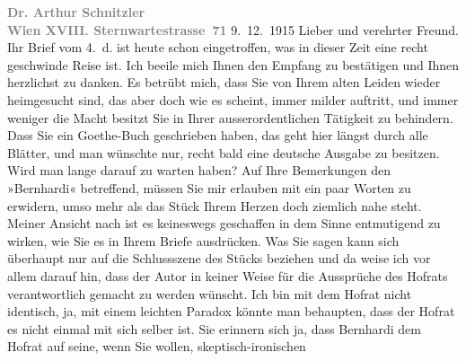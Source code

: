 \begin{ledgroupsized}[t]{13cm}
           \noindent{}{\pb}\textcolor{gray}{\textbf{Dr. Arthur Schnitzler}}{\\}\textcolor{gray}{\textbf{Wien XVIII. Sternwartestrasse 71}}\pend
           \pstart
           \raggedleft{}9. 12. 1915\pend
           \pstart\center{}Lieber und verehrter Freund.\pend\pstart
           Ihr Brief vom 4. d. ist heute schon eingetroffen, was in dieser Zeit
               eine recht geschwinde Reise ist. Ich beeile mich Ihnen den Empfang zu bestätigen und
               Ihnen herzlichst zu danken. Es betrübt mich, dass Sie von Ihrem alten Leiden wieder
               heimgesucht sind, das aber doch wie es scheint, immer milder auftritt, und immer
               weniger die Macht besitzt Sie in Ihrer ausserordentlichen Tätigkeit zu behindern.
               Dass Sie ein Goethe-Buch geschrieben haben, das
               geht hier längst durch alle Blätter, und man wünschte nur, recht bald eine deutsche
               Ausgabe zu besitzen. Wird man lange darauf zu warten haben?\pend
           \pstart
           Auf Ihre Bemerkungen den »Bernhardi« betreffend,
               müssen Sie mir erlauben mit ein paar Worten zu erwidern, umso mehr als das Stück
               Ihrem Herzen doch ziemlich nahe steht. Meiner Ansicht nach ist es keineswegs
               geschaffen in {\pb}dem Sinne entmutigend zu wirken,
               wie Sie es in Ihrem Briefe ausdrücken. Was Sie sagen kann sich überhaupt nur auf die
               Schlussszene des Stücks beziehen und da weise ich vor allem darauf hin, dass der
               Autor in keiner Weise für die Aussprüche des Hofrats verantwortlich gemacht zu werden
               wünscht. Ich bin mit dem Hofrat nicht identisch, ja, mit einem leichten Paradox
               könnte man behaupten, dass der Hofrat es nicht einmal mit sich selber ist. Sie
               erinnern sich ja, dass Bernhardi dem Hofrat auf seine, wenn Sie wollen, skeptisch-ironischen

\end{ledgroupsized}
